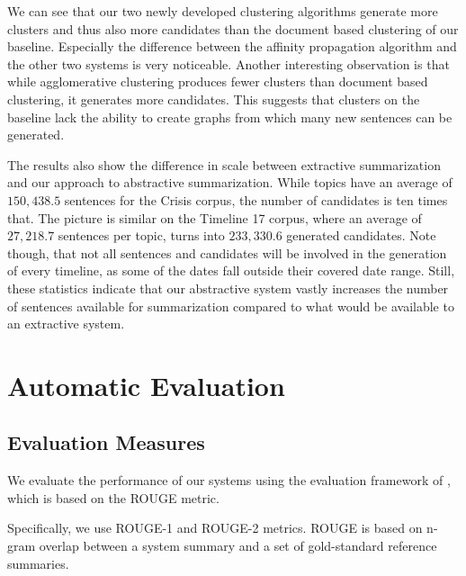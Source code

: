 \documentclass[a4paper,BCOR=10mm]{report}
\numberwithin{lemma}{chapter}
\numberwithin{definition}{chapter}
\begin{document}
We can see that our two newly developed clustering algorithms generate more clusters and thus also more candidates than the document based clustering of our baseline. Especially the difference between the affinity propagation algorithm and the other two systems is very noticeable.
Another interesting observation is that while agglomerative clustering produces fewer clusters than document based clustering, it generates more candidates. This suggests that clusters on the baseline lack the ability to create graphs from which many new sentences can be generated.

The results also show the difference in scale between extractive summarization and our approach to abstractive summarization.
While topics have an average of $150,438.5$ sentences for the Crisis corpus, the number of candidates is ten times that.
The picture is similar on the Timeline 17 corpus, where an average of $27,218.7$ sentences per topic, turns into $233,330.6$ generated candidates. Note though, that not all sentences and candidates will be involved in the generation of every timeline, as some of the dates fall outside their covered date range.
Still, these statistics indicate that our abstractive system vastly increases the number of sentences available for summarization compared to what would be available to an extractive system.


%
%

\chapter{Automatic Evaluation} \label{sec:results-auto}

\section{Evaluation Measures} \label{sec:evaluation-auto-setup}

We evaluate the performance of our systems using the evaluation framework of \citet{tilse}, which is based on the ROUGE \citep{rouge} metric.

Specifically, we use ROUGE-1 and ROUGE-2 metrics.
ROUGE is based on n-gram overlap between a system summary and a set of gold-standard reference summaries.
\end{document}
